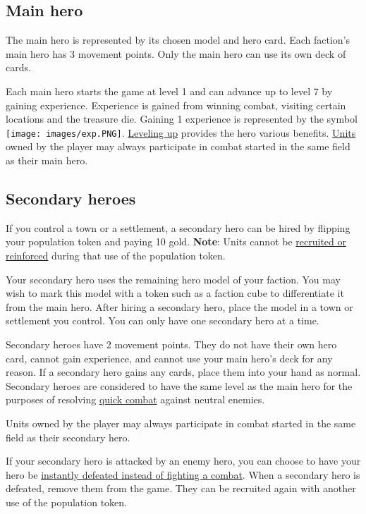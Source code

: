 \documentclass[12pt]{article}
\begin{document}
\subsection*{Main hero}
The main hero is represented by its chosen model and hero card. Each faction’s main hero has 3 movement points. Only the main hero can use its own deck of cards.\par
Each main hero starts the game at level 1 and can advance up to level 7 by gaining experience. Experience is gained from winning combat, visiting certain locations and the treasure die. Gaining 1 experience is represented by the symbol \texttt{[image: images/exp.PNG]}. \hyperlink{Level}{Leveling up} provides the hero various benefits. \hyperlink{Units}{Units} owned by the player may always participate in combat started in the same field as their main hero.
\subsection*{\hypertarget{Secondary}{Secondary heroes}}
If you control a town or a settlement, a secondary hero can be hired by flipping your population token and paying 10 gold. \textbf{Note}: Units cannot be \hyperlink{Units}{recruited or reinforced} during that use of the population token.\par
Your secondary hero uses the remaining hero model of your faction. You may wish to mark this model with a token such as a faction cube to differentiate it from the main hero. After hiring a secondary hero, place the model in a town or settlement you control. You can only have one secondary hero at a time.\par
Secondary heroes have 2 movement points. They do not have their own hero card, cannot gain experience, and cannot use your main hero's deck for any reason. If a secondary hero gains any cards, place them into your hand as normal.
Secondary heroes are considered to have the same level as the main hero for the purposes of resolving \hyperlink{Quick}{quick combat} against neutral enemies.\par
Units owned by the player may always participate in combat started in the same field as their secondary hero.\par
If your secondary hero is attacked by an enemy hero, you can choose to have your hero be \hyperlink{Endcombat}{instantly defeated instead of fighting a combat}. When a secondary hero is defeated, remove them from the game. They can be recruited again with another use of the population token.\par
\end{document}
